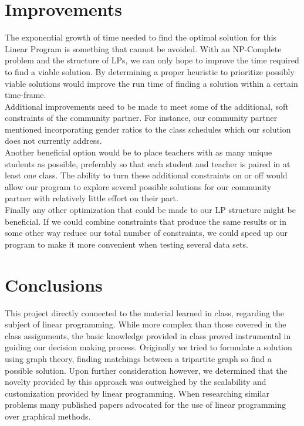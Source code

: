 \documentclass[11pt]{article}
\begin{document}
\section{Improvements}
The exponential growth of time needed to find the optimal solution for this Linear Program is something that cannot be avoided. With an NP-Complete problem and the structure of LPs, we can only hope to improve the time required to find a viable solution. By determining a proper heuristic to prioritize possibly viable solutions would improve the run time of finding a solution within a certain time-frame.\\
\indent Additional improvements need to be made to meet some of the additional, soft constraints of the community partner. For instance, our community partner mentioned incorporating gender ratios to the class schedules which our solution does not currently address.\\
\indent Another beneficial option would be to place teachers with as many unique students as possible, preferably so that each student and teacher is paired in at least one class. The ability to turn these additional constraints on or off would allow our program to explore several possible solutions for our community partner with relatively little effort on their part.\\
\indent Finally any other optimization that could be made to our LP structure might be beneficial. If we could combine constraints that produce the same results or in some other way reduce our total number of constraints, we could speed up our program to make it more convenient when testing several data sets.

\section{Conclusions}
This project directly connected to the material learned in class, regarding the subject of linear programming. While more complex than those covered in the class assignments, the basic knowledge provided in class proved instrumental in guiding our decision making process. Originally we tried to formulate a solution using graph theory, finding matchings between a tripartite graph so find a possible solution. Upon further consideration however, we determined that the novelty provided by this approach was outweighed by the scalability and customization provided by linear programming. When researching similar problems many published papers advocated for the use of linear programming over graphical methods.
\end{document}
